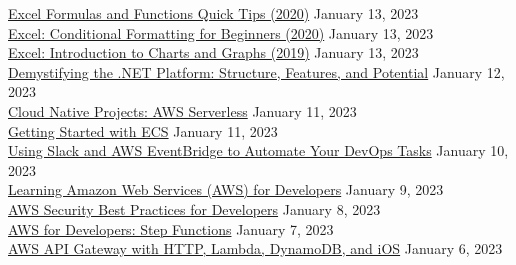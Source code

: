\documentclass[10pt]{res} %
\begin{document}
\begin{resume}
\href{https://www.linkedin.com/learning/certificates/366dad47781ef56a48bf049516a6a9836b379207670d410772984af63f445c7a}{\color{blue}Excel Formulas and Functions Quick Tips (2020)} \hfill January 13, 2023 \\
\href{https://www.linkedin.com/learning/certificates/fd04e8c17efe1d01e0b35b07367c54ce01fdc369c64758291f5cfdbbb19a99f6}{\color{blue}Excel: Conditional Formatting for Beginners (2020)} \hfill January 13, 2023 \\
\href{https://www.linkedin.com/learning/certificates/9c80f049ed38f5863a834ebd87336ff16dc604b8dc7a15f5d99576d6334c7641}{\color{blue}Excel: Introduction to Charts and Graphs (2019)} \hfill January 13, 2023 \\
\href{https://www.linkedin.com/learning/certificates/bebce5cafb81df71aeb4bd7b1e9e57127e7a4a32f0d10fac2f25c99be9c1c452}{\color{blue}Demystifying the .NET Platform: Structure, Features, and Potential} \hfill January 12, 2023 \\
\href{https://www.linkedin.com/learning/certificates/3a3467b17c62e0801383c4414891570e33390d266c736d2b86f81913e2e53d0b}{\color{blue}Cloud Native Projects: AWS Serverless} \hfill January 11, 2023 \\
\href{https://www.linkedin.com/learning/certificates/b28df6c03ded1ba97fb6be35594b288a76aa9f0a80173024d86e5be14758e973}{\color{blue}Getting Started with ECS} \hfill January 11, 2023 \\
\href{https://www.linkedin.com/learning/certificates/25274b38cc6fae1139b85758ee0c94c1c2a1bb38fef6c2601f47c01fb0de4eb6}{\color{blue}Using Slack and AWS EventBridge to Automate Your DevOps Tasks} \hfill January 10, 2023 \\
\href{https://www.linkedin.com/learning/certificates/485ad700103945351be70eba5a2ef4c464fb0d7e936415578594755a227bd096}{\color{blue}Learning Amazon Web Services (AWS) for Developers} \hfill January 9, 2023 \\
\href{https://www.linkedin.com/learning/certificates/31978b1c86b5775b2d2abd8d9f796533fa567a17c9ada95fc549e6dd7a3fc308}{\color{blue}AWS Security Best Practices for Developers} \hfill January 8, 2023 \\
\href{https://www.linkedin.com/learning/certificates/c17306c38cb4dcf7662f852ca77c2a574210705f0d8eed065aa6f82eacca1377}{\color{blue}AWS for Developers: Step Functions} \hfill January 7, 2023 \\
\href{https://www.linkedin.com/learning/certificates/f9f6db68e44bcb5a09f7f3a06f67d4705075692230dc4bd443a1dfbb76151581}{\color{blue}AWS API Gateway with HTTP, Lambda, DynamoDB, and iOS} \hfill January 6, 2023 \\

\end{resume}
\end{document}
